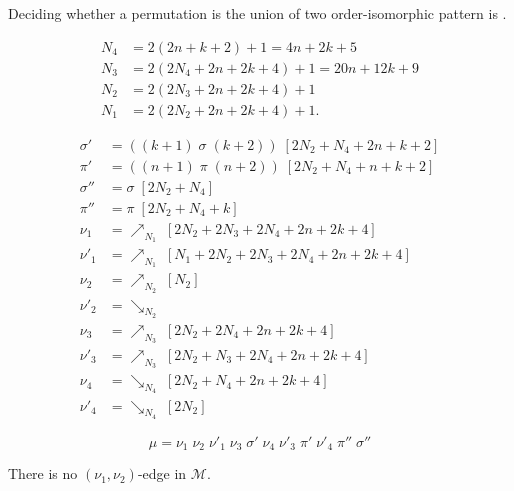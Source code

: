 \documentclass[a4paper,10pt]{llncs}
\begin{document}
\begin{proposition}
Deciding whether a permutation is the union of two
order-isomorphic pattern is \NPC.
\end{proposition}


\begin{align*}
N_4 &= 2(2n + k + 2) + 1  = 4n + 2k + 5 \\
N_3 &= 2(2N_4 + 2n + 2k + 4) + 1 = 20n + 12k + 9 \\
N_2 &= 2(2N_3 + 2n + 2k + 4) + 1 \\
N_1 &= 2(2N_2 + 2n + 2k + 4) + 1\text{.}
\end{align*}

\begin{align*}
\sigma'  &= ((k+1) \; \sigma \; (k+2)) \; [2N_2 + N_4 + 2n + k + 2] \\
\pi'     &= ((n+1) \; \pi \; (n+2)) \; [2N_2 + N_4 + n + k + 2] \\
\sigma'' &= \sigma \; [2N_2 + N_4] \\
\pi''    &= \pi \; [2N_2 + N_4 + k] \\
\nu_1    &= \nearrow_{N_1} \; [2N_2 + 2N_3 + 2N_4 + 2n + 2k + 4] \\
\nu'_1   &= \nearrow_{N_1} \; [N_1 + 2N_2 + 2N_3 + 2N_4 + 2n + 2k + 4] \\
\nu_2    &= \nearrow_{N_2} \; [N_2] \\
\nu'_2   &= \searrow_{N_2} \\
\nu_3    &= \nearrow_{N_3} \; [2N_2 + 2N_4 + 2n + 2k + 4] \\
\nu'_3   &= \nearrow_{N_3} \; [2N_2 + N_3 + 2N_4 + 2n + 2k + 4] \\
\nu_4    &= \searrow_{N_4} \; [2N_2 + N_4 + 2n + 2k + 4] \\
\nu'_4   &= \searrow_{N_4} \; [2N_2]
\end{align*}

$$
\mu
=
\nu_1 \; \nu_2 \; \nu'_1 \; \nu_3 \; \sigma' \; \nu_4 \; \nu'_3 \; \pi' \; \nu'_4 \; \pi'' \; \sigma''
$$

\begin{claim}
  \label{claim:no nu_1 - nu_1 edge}
  There is no $(\nu_1, \nu_2)$-edge in $\mathcal{M}$.
\end{claim}
\end{document}
